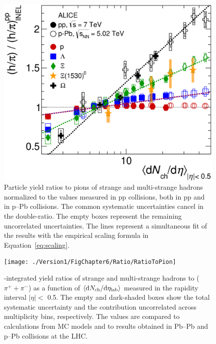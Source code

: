 \begin{figure}[htbp]
\begin{center}
\includegraphics[width=10.cm]{./Version1/FigChapter6/Ratio/RatioToPionXiStar}
\caption{ Particle yield ratios to pions of strange and multi-strange hadrons normalized to the values measured in pp collisions, both in pp and in p--Pb collisions. The common systematic uncertainties cancel in the double-ratio. The empty boxes represent the remaining uncorrelated uncertainties. The lines represent a simultaneous fit of the results with the empirical scaling formula in Equation~\ref{eq:scaling}.}
\label{fig:doubler}
\end{center}
\end{figure}


\begin{figure}[htbp]
\begin{center}
\texttt{[image: ./Version1/FigChapter6/Ratio/RatioToPion]}
\caption{ \pt-integrated yield ratios of strange and multi-strange hadrons to ($\pi^{+}+\pi^{-}$) as a function of $\meandNdeta$ measured in the rapidity interval $|\eta|<$ 0.5. The empty and dark-shaded boxes show the total systematic uncertainty and the contribution uncorrelated across multiplicity bins, respectively. The values are compared to calculations from MC models and to results obtained in Pb--Pb and p--Pb collisions at the LHC.}
\label{fig:topi}
\end{center}
\end{figure}



\newpage
